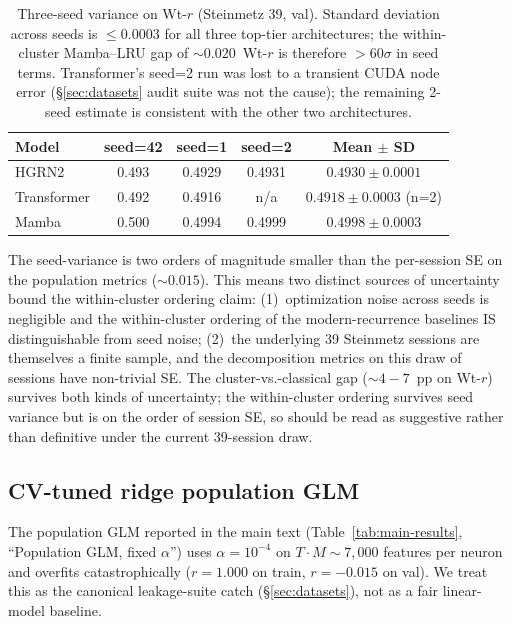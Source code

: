\documentclass{article}
\begin{document}
\begin{table}[h]
  \caption{Three-seed variance on Wt-$r$ (Steinmetz 39, val).  Standard
    deviation across seeds is $\leq 0.0003$ for all three top-tier
    architectures; the within-cluster Mamba--LRU gap of
    $\sim 0.020$~Wt-$r$ is therefore $> 60\sigma$ in seed terms.
    Transformer's seed=2 run was lost to a transient CUDA node error
    (\S\ref{sec:datasets} audit suite was not the cause); the
    remaining 2-seed estimate is consistent with the other two
    architectures.}
  \label{tab:seed-variance}
  \centering
  \small
  \begin{tabular}{@{} l c c c c @{}}
    \toprule
    \textbf{Model} & \textbf{seed=42}
      & \textbf{seed=1} & \textbf{seed=2}
      & \textbf{Mean $\pm$ SD} \\
    \midrule
    HGRN2       & 0.493 & 0.4929 & 0.4931 & $0.4930 \pm 0.0001$ \\
    Transformer & 0.492 & 0.4916 & n/a & $0.4918 \pm 0.0003$ (n=2) \\
    Mamba       & 0.500 & 0.4994 & 0.4999 & $0.4998 \pm 0.0003$ \\
    \bottomrule
  \end{tabular}
\end{table}

The seed-variance is two orders of magnitude smaller than the
per-session SE on the population metrics (${\sim}0.015$).  This means
two distinct sources of uncertainty bound the within-cluster ordering
claim: (1)~optimization noise across seeds is negligible and the
within-cluster ordering of the modern-recurrence baselines IS
distinguishable from seed noise; (2)~the underlying 39 Steinmetz
sessions are themselves a finite sample, and the decomposition metrics
on this draw of sessions have non-trivial SE.  The cluster-vs.-classical
gap (${\sim}4{-}7$~pp on Wt-$r$) survives both kinds of uncertainty;
the within-cluster ordering survives seed variance but is on the order
of session SE, so should be read as suggestive rather than definitive
under the current 39-session draw.

\subsection{CV-tuned ridge population GLM}
\label{app:cv-ridge-glm}

The population GLM reported in the main text
(Table~\ref{tab:main-results}, ``Population GLM, fixed $\alpha$'')
uses $\alpha{=}10^{-4}$ on $T \cdot M{\sim}7{,}000$ features per neuron
and overfits catastrophically ($r{=}1.000$ on train, $r{=}{-}0.015$ on
val).  We treat this as the canonical leakage-suite catch
(\S\ref{sec:datasets}), not as a fair linear-model baseline.
\end{document}
